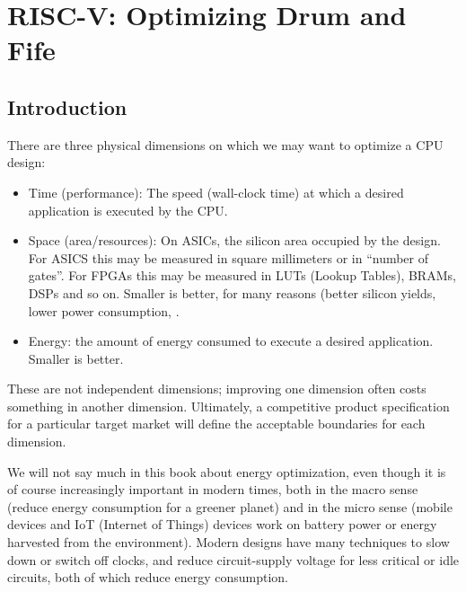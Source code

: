 

\chapter{RISC-V: Optimizing Drum and Fife}


\setcounter{page}{1}
\renewcommand{\thepage}{\arabic{chapter}-\arabic{page}}

\label{ch_Optimization}


\section{Introduction}

There are three physical dimensions on which we may want to optimize a
CPU design:

\begin{itemize}

 \item Time (performance): The speed (wall-clock time) at which a
       desired application is executed by the CPU.

 \item Space (area/resources): On ASICs, the silicon area occupied by
       the design.  For ASICS this may be measured in square
       millimeters or in ``number of gates''.  For FPGAs this may be
       measured in LUTs (Lookup Tables), BRAMs, DSPs and so on.
       Smaller is better, for many reasons (better silicon yields,
       lower power consumption, {\etc}.

 \item Energy: the amount of energy consumed to execute a desired
       application. Smaller is better.

\end{itemize}

These are not independent dimensions; improving one dimension often
costs something in another dimension.  Ultimately, a competitive
product specification for a particular target market will define the
acceptable boundaries for each dimension.

We will not say much in this book about energy optimization, even
though it is of course increasingly important in modern times, both in
the macro sense (reduce energy consumption for a greener planet) and
in the micro sense (mobile devices and IoT (Internet of Things)
devices work on battery power or energy harvested from the
environment).  Modern designs have many techniques to slow down or
switch off clocks, and reduce circuit-supply voltage for less critical
or idle circuits, both of which reduce energy consumption.

